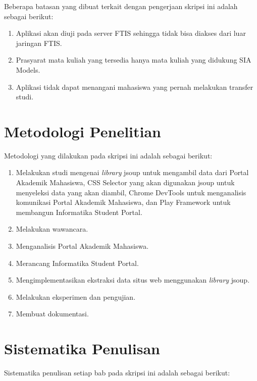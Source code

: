 Beberapa batasan yang dibuat terkait dengan pengerjaan skripsi ini adalah sebagai berikut:
\begin{enumerate}
	\item Aplikasi akan diuji pada server FTIS sehingga tidak bisa diakses dari luar jaringan FTIS.
	\item Prasyarat mata kuliah yang tersedia hanya mata kuliah yang didukung SIA Models.
	\item Aplikasi tidak dapat menangani mahasiswa yang pernah melakukan transfer studi.
\end{enumerate}

\section{Metodologi Penelitian}
\label{sec:metode_penelitian}

Metodologi yang dilakukan pada skripsi ini adalah sebagai berikut:

\begin{enumerate}
	\item Melakukan studi mengenai \textit{library} jsoup untuk mengambil data dari Portal Akademik Mahasiswa, CSS Selector yang akan digunakan jsoup untuk menyeleksi data yang akan diambil, Chrome DevTools untuk menganalisis komunikasi Portal Akademik Mahasiswa, dan Play Framework untuk membangun Informatika Student Portal.
	\item Melakukan wawancara.
	\item Menganalisis Portal Akademik Mahasiswa.
	\item Merancang Informatika Student Portal.
	\item Mengimplementasikan ekstraksi data situs web menggunakan \textit{library} jsoup.
	\item Melakukan eksperimen dan pengujian.
	\item Membuat dokumentasi.
\end{enumerate}

\section{Sistematika Penulisan}
\label{sec:sistematika_penulisan}

Sistematika penulisan setiap bab pada skripsi ini adalah sebagai berikut:

